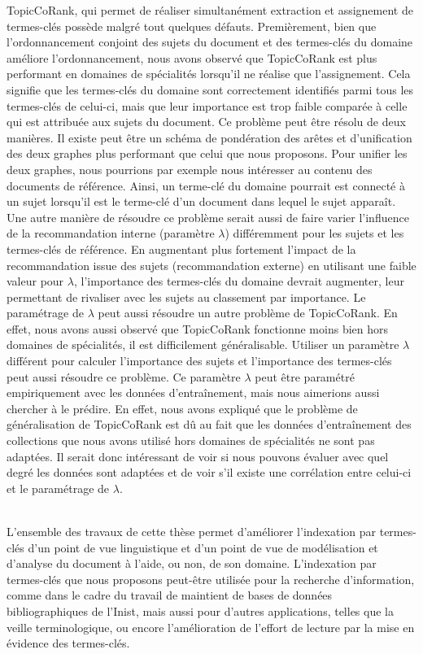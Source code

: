     TopicCoRank, qui permet de réaliser simultanément extraction et assignement
    de termes-clés possède malgré tout quelques défauts. Premièrement, bien que
    l'ordonnancement conjoint des sujets du document et des termes-clés du
    domaine améliore l'ordonnancement, nous avons observé que TopicCoRank est
    plus performant en domaines de spécialités lorsqu'il ne réalise que
    l'assignement. Cela signifie que les termes-clés du domaine sont
    correctement identifiés parmi tous les termes-clés de celui-ci, mais que
    leur importance est trop faible comparée à celle qui est attribuée aux
    sujets du document. Ce problème peut être résolu de deux manières. Il existe
    peut être un schéma de pondération des arêtes et d'unification des deux
    graphes plus performant que celui que nous proposons. Pour unifier les deux
    graphes, nous pourrions par exemple nous intéresser au contenu des documents
    de référence. Ainsi, un terme-clé du domaine pourrait est connecté à un
    sujet lorsqu'il est le terme-clé d'un document dans lequel le sujet
    apparaît. Une autre manière de résoudre ce problème serait aussi de faire
    varier l'influence de la recommandation interne (paramètre $\lambda$)
    différemment pour les sujets et les termes-clés de référence. En augmentant
    plus fortement l'impact de la recommandation issue des sujets
    (recommandation externe) en utilisant une faible valeur pour $\lambda$,
    l'importance des termes-clés du domaine devrait augmenter, leur permettant
    de rivaliser avec les sujets au classement par importance. Le paramétrage de
    $\lambda$ peut aussi résoudre un autre problème de TopicCoRank. En effet,
    nous avons aussi observé que TopicCoRank fonctionne moins bien hors domaines
    de spécialités, il est difficilement généralisable. Utiliser un paramètre
    $\lambda$ différent pour calculer l'importance des sujets et l'importance
    des termes-clés peut aussi résoudre ce problème. Ce paramètre $\lambda$ peut
    être paramétré empiriquement avec les données d'entraînement, mais nous
    aimerions aussi chercher à le prédire. En effet, nous avons expliqué que le
    problème de généralisation de TopicCoRank est dû au fait que les données
    d'entraînement des collections que nous avons utilisé hors domaines de
    spécialités ne sont pas adaptées. Il serait donc intéressant de voir si nous
    pouvons évaluer avec quel degré les données sont adaptées et de voir s'il
    existe une corrélation entre celui-ci et le paramétrage de $\lambda$.

    ~\\L'ensemble des travaux de cette thèse permet d'améliorer l'indexation par
    termes-clés d'un point de vue linguistique et  d'un point de vue de
    modélisation et d'analyse du document à l'aide, ou non, de son domaine.
    L'indexation par termes-clés que nous proposons peut-être utilisée pour la
    recherche d'information, comme dans le cadre du travail de maintient de
    bases de données bibliographiques de l'Inist, mais aussi pour d'autres
    applications, telles que la veille terminologique, ou encore l'amélioration
    de l'effort de lecture par la mise en évidence des termes-clés.

